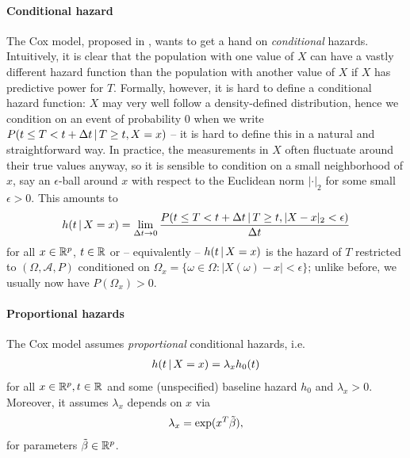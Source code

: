 \paragraph{Conditional hazard}
The Cox model, proposed in \cite{cox72}, wants to get a hand on \textit{conditional} hazards.
Intuitively, it is clear that the population with one value of $X$ can have a vastly different 
hazard function than the population with another value of $X$ if $X$ has predictive power for $T$.
Formally, however, it is hard to define a conditional hazard function: $X$ may very well follow a 
density-defined distribution, hence we condition on an event of probability $0$ when we write 
$P(t \leq T < t + \Delta t \,|\, T \geq t, X = x)$ -- it is hard to define this in a natural
and straightforward way. In practice, the measurements in $X$ often fluctuate around their true 
values anyway, so it is sensible to condition on a small neighborhood of $x$, say an $\epsilon$-ball 
around $x$ with respect to the Euclidean norm $|\cdot|_2$ for some small $\epsilon > 0$. This 
amounts to
\begin{align}
    h(t \,|\, X = x) = \lim_{\Delta t \to 0} \frac{P(t \leq T < t + \Delta t \,|\, T \geq t, 
    |X - x|_2 < \epsilon)}{\Delta t}
\end{align}
for all $x \in \mathbb{R}^p$, $t \in \mathbb{R}$
or -- equivalently -- $h(t \,|\, X = x)$ is the hazard of $T$ restricted to $(\Omega, \mathcal{A}, 
P)$ conditioned on $\Omega_x = \{ \omega \in \Omega: |X(\omega) - x| < \epsilon \}$; unlike before, 
we usually now have $P(\Omega_x) > 0$.

\paragraph{Proportional hazards} The Cox model assumes \textit{proportional} conditional hazards, 
i.e. 
\begin{align}
    h(t \,|\, X = x) = \lambda_x h_0(t)
\end{align}
for all $x \in \mathbb{R}^p, t \in \mathbb{R}$ and some (unspecified) baseline hazard $h_0$ and $\lambda_x > 0$. 
Moreover, it assumes $\lambda_x$ depends on $x$ via 
\begin{align}\label{eq:cox-proportional-factor}
    \lambda_x = \exp(x^T \tilde{\beta}),
\end{align}
for parameters $\tilde{\beta} \in \mathbb{R}^p$.


